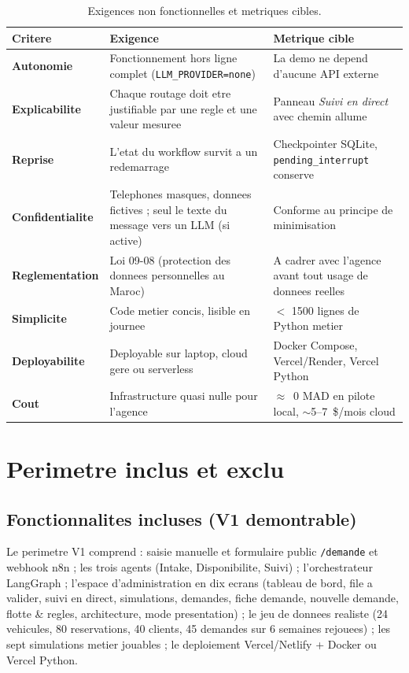 \documentclass[12pt,a4paper,openany]{report}
\begin{document}
\begin{table}[H]\centering\small
\caption{Exigences non fonctionnelles et metriques cibles.}
\label{tab:nfr}
\begin{tabularx}{\textwidth}{>{\bfseries}l X X}\toprule
\rowcolor{boxOrange!30}Critere & Exigence & Metrique cible\\\midrule
Autonomie      & Fonctionnement hors ligne complet (\texttt{LLM\_PROVIDER=none}) & La demo ne depend d'aucune API externe\\
Explicabilite  & Chaque routage doit etre justifiable par une regle et une valeur mesuree & Panneau \emph{Suivi en direct} avec chemin allume\\
Reprise        & L'etat du workflow survit a un redemarrage & Checkpointer SQLite, \texttt{pending\_interrupt} conserve\\
Confidentialite & Telephones masques, donnees fictives ; seul le texte du message vers un LLM (si active) & Conforme au principe de minimisation\\
Reglementation & Loi 09-08 (protection des donnees personnelles au Maroc) & A cadrer avec l'agence avant tout usage de donnees reelles\\
Simplicite     & Code metier concis, lisible en journee & $<$ 1500 lignes de Python metier\\
Deployabilite  & Deployable sur laptop, cloud gere ou serverless & Docker Compose, Vercel/Render, Vercel Python\\
Cout           & Infrastructure quasi nulle pour l'agence & $\approx$~0 MAD en pilote local, $\sim$5--7~\$/mois cloud\\
\bottomrule
\end{tabularx}
\end{table}

\section{Perimetre inclus et exclu}

\subsection{Fonctionnalites incluses (V1 demontrable)}
Le perimetre V1 comprend : saisie manuelle et formulaire public \texttt{/demande} et webhook n8n ; les trois agents (Intake, Disponibilite, Suivi) ; l'orchestrateur LangGraph ; l'espace d'administration en dix ecrans (tableau de bord, file a valider, suivi en direct, simulations, demandes, fiche demande, nouvelle demande, flotte \& regles, architecture, mode presentation) ; le jeu de donnees realiste (24 vehicules, 80 reservations, 40 clients, 45 demandes sur 6 semaines rejouees) ; les sept simulations metier jouables ; le deploiement Vercel/Netlify + Docker ou Vercel Python.
\end{document}
